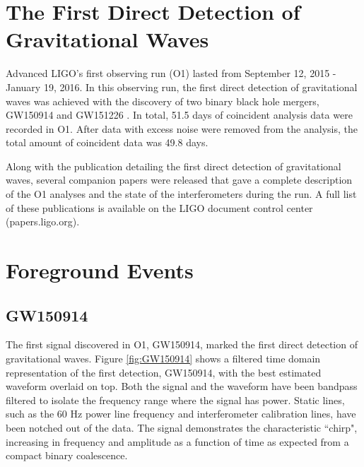 \section{The First Direct Detection of Gravitational Waves}

Advanced LIGO's first observing run (O1) lasted from September 12, 2015 - 
January 19, 2016. In this observing run, the first direct detection of 
gravitational waves was achieved with the discovery of two binary black 
hole mergers, GW150914 and GW151226 \cite{GW150914-DETECTION,GW151226}. 
In total, 51.5 days of coincident analysis data were recorded in O1. 
After data with excess noise were removed from the analysis, the 
total amount of coincident data was 49.8 days.

Along with the publication detailing the first direct detection of 
gravitational waves, several companion papers were released 
that gave a complete description of the O1 analyses and the state 
of the interferometers during the run. A full list of these 
publications is available on the LIGO document control center 
(papers.ligo.org). 

\section{Foreground Events}

\subsection{GW150914}

The first signal discovered in O1, GW150914, marked the first 
direct detection of gravitational waves.
Figure \ref{fig:GW150914} shows a 
filtered time domain representation of the first detection, 
GW150914, with the best estimated 
waveform overlaid on top. Both the signal and the waveform have been 
bandpass filtered to isolate the frequency range where the signal has 
power. Static lines, such as the 60 Hz power line frequency and 
interferometer calibration lines, have been notched out of the data. 
The signal demonstrates the characteristic ``chirp", 
increasing in frequency and amplitude as a function of time as  
expected from a compact binary coalescence. 

